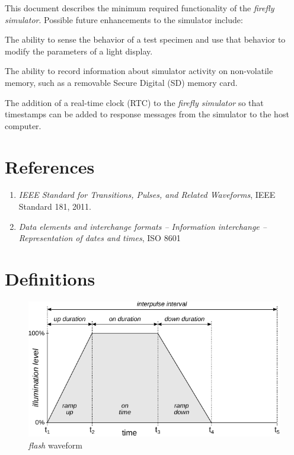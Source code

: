 \documentclass[letterpaper,11pt]{article}
\begin{document}
This document describes the minimum required functionality of the
\textit{firefly simulator}. Possible future enhancements to the simulator
include:
\begin{compactitem}
  \item The ability to sense the behavior of a test specimen and use that
    behavior to modify the parameters of a light display.
  \item The ability to record information about simulator activity on
    non-volatile memory, such as a removable Secure Digital (SD) memory card.
  \item The addition of a real-time clock (RTC) to the \textit{firefly
    simulator} so that timestamps can be added to response messages from the 
    simulator to the host computer.
\end{compactitem}

\section{References}

\begin{enumerate}
  \item 
\textit{IEEE Standard for Transitions, Pulses, and Related Waveforms},
  IEEE Standard 181, 2011.
  \item 
\textit{Data elements and interchange formats – Information
interchange – Representation of dates and times}, ISO 8601
\end{enumerate}


\section{Definitions}

\begin{figure}[h]
  \begin{center}
    \includegraphics{Flashes_FlashPulse}
  \end{center}
  \vspace{-18pt}
  \caption{\textit{flash} waveform}
  \label{fig:FlashPulse}
\end{figure}
\end{document}
